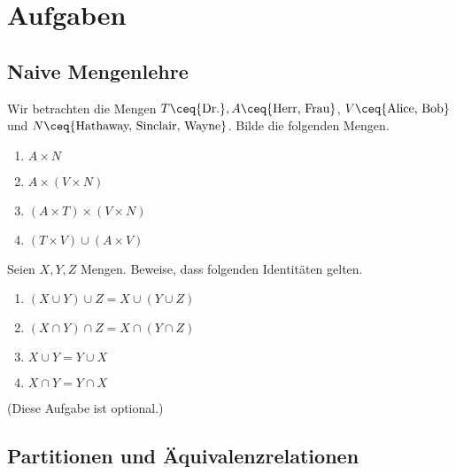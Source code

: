 \section*{Aufgaben}


\subsection*{Naive Mengenlehre}


\begin{aufg}

  Wir betrachten die Mengen $T \ceq \{ \text{Dr.} \}, A \ceq \{ \text{Herr, Frau} \}$, $V
  \ceq \{ \text{Alice, Bob} \}$ und $N \ceq \{ \text{Hathaway, Sinclair, Wayne}
  \}$. Bilde die folgenden Mengen.
  \begin{enumerate}
    \item $A \times N$
    \item $A \times (V \times N)$
    \item $(A\times T) \times (V\times N)$
    \item $(T \times V) \cup (A \times V)$
  \end{enumerate}
  
\end{aufg}


\begin{aufg}

  Seien $X,Y,Z$ Mengen. Beweise, dass folgenden Identitäten gelten.
  \begin{enumerate}
    \item $(X\cup Y) \cup Z = X\cup (Y\cup Z)$
    \item $(X\cap Y) \cap Z = X\cap (Y\cap Z)$
    \item $X \cup Y = Y \cup X$
    \item $X \cap Y = Y \cap X$
  \end{enumerate}
  (Diese Aufgabe ist optional.)
  
\end{aufg}


\subsection*{Partitionen und Äquivalenzrelationen}


